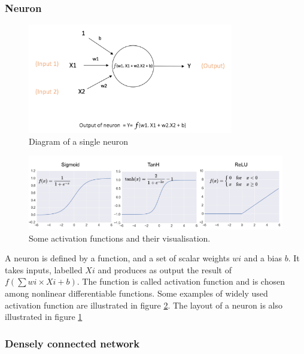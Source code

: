 \subsubsection{Neuron}

\begin{figure}
    \centering
    \includegraphics[width=0.8\textwidth]{Images/neuron_diagram}
    \caption{Diagram of a single neuron}
    \label{fig:neuron_diagram}
\end{figure}


\begin{figure}
    \centering
    \includegraphics[width=\textwidth]{Images/activation_functions.png}
    \caption{Some activation functions and their visualisation.}
    \label{fig:activation_functions}
\end{figure}

A neuron is defined by a function, and a set of scalar weights $wi$ and a bias $b$. It takes inputs, labelled $Xi$ and produces as output the result of $f(\sum wi\times Xi + b)$. The function is called activation function and is chosen among nonlinear differentiable functions. Some examples of widely used activation function are illustrated in figure \ref{fig:activation_functions}. The layout of a neuron is also illustrated in figure \ref{fig:neuron_diagram}

\subsubsection{Densely connected network}


